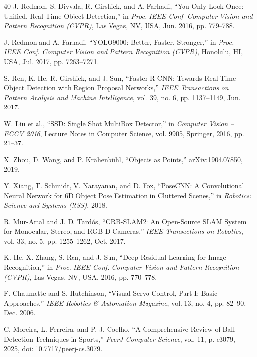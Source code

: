 \begin{thebibliography}{40}
 J. Redmon, S. Divvala, R. Girshick, and A. Farhadi, ``You Only Look Once: Unified, Real-Time Object Detection,'' in \textit{Proc. IEEE Conf. Computer Vision and Pattern Recognition (CVPR)}, Las Vegas, NV, USA, Jun. 2016, pp. 779--788.

 J. Redmon and A. Farhadi, ``YOLO9000: Better, Faster, Stronger,'' in \textit{Proc. IEEE Conf. Computer Vision and Pattern Recognition (CVPR)}, Honolulu, HI, USA, Jul. 2017, pp. 7263--7271.

 S. Ren, K. He, R. Girshick, and J. Sun, ``Faster R-CNN: Towards Real-Time Object Detection with Region Proposal Networks,'' \textit{IEEE Transactions on Pattern Analysis and Machine Intelligence}, vol. 39, no. 6, pp. 1137--1149, Jun. 2017.

 W. Liu et al., ``SSD: Single Shot MultiBox Detector,'' in \textit{Computer Vision -- ECCV 2016}, Lecture Notes in Computer Science, vol. 9905, Springer, 2016, pp. 21--37.

 X. Zhou, D. Wang, and P. Kr\"ahenb\"uhl, ``Objects as Points,'' arXiv:1904.07850, 2019.

 Y. Xiang, T. Schmidt, V. Narayanan, and D. Fox, ``PoseCNN: A Convolutional Neural Network for 6D Object Pose Estimation in Cluttered Scenes,'' in \textit{Robotics: Science and Systems (RSS)}, 2018.

 R. Mur-Artal and J. D. Tard{\'o}s, ``ORB-SLAM2: An Open-Source SLAM System for Monocular, Stereo, and RGB-D Cameras,'' \textit{IEEE Transactions on Robotics}, vol. 33, no. 5, pp. 1255--1262, Oct. 2017.

 K. He, X. Zhang, S. Ren, and J. Sun, ``Deep Residual Learning for Image Recognition,'' in \textit{Proc. IEEE Conf. Computer Vision and Pattern Recognition (CVPR)}, Las Vegas, NV, USA, 2016, pp. 770--778.

 F. Chaumette and S. Hutchinson, ``Visual Servo Control, Part I: Basic Approaches,'' \textit{IEEE Robotics \& Automation Magazine}, vol. 13, no. 4, pp. 82--90, Dec. 2006.

 C. Moreira, L. Ferreira, and P. J. Coelho, ``A Comprehensive Review of Ball Detection Techniques in Sports,'' \textit{PeerJ Computer Science}, vol. 11, p. e3079, 2025, doi: 10.7717/peerj-cs.3079.

\end{thebibliography}